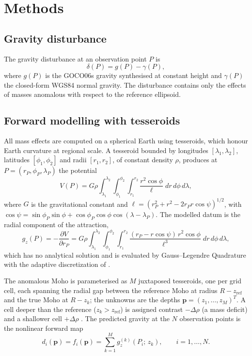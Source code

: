\documentclass[extra,mreferee]{gji}
\begin{document}
\section{Methods}
\subsection{Gravity disturbance}
The gravity disturbance at an observation point $P$ is
\begin{equation}
\delta(P) = g(P) - \gamma(P),
\label{eq:disturbance}
\end{equation}
where $g(P)$ is the {GOCO06s} gravity synthesised at constant height and
$\gamma(P)$ the closed-form {WGS84} normal gravity. The disturbance contains only
the effects of masses anomalous with respect to the reference ellipsoid.

\subsection{Forward modelling with tesseroids}
All mass effects are computed on a spherical Earth using tesseroids, which honour
Earth curvature at regional scale. A tesseroid bounded by longitudes
$[\lambda_1,\lambda_2]$, latitudes $[\phi_1,\phi_2]$ and radii $[r_1,r_2]$, of
constant density $\rho$, produces at $P=(r_P,\phi_P,\lambda_P)$ the potential
\begin{equation}
V(P) = G\rho \int_{\lambda_1}^{\lambda_2}\!\!\int_{\phi_1}^{\phi_2}\!\!\int_{r_1}^{r_2}
       \frac{r^2\cos\phi}{\ell}\; dr\,d\phi\,d\lambda,
\label{eq:potential}
\end{equation}
where $G$ is the gravitational constant and
$\ell=(r_P^2+r^2-2r_Pr\cos\psi)^{1/2}$, with
$\cos\psi=\sin\phi_P\sin\phi+\cos\phi_P\cos\phi\cos(\lambda-\lambda_P)$. The
modelled datum is the radial component of the attraction,
\begin{equation}
g_z(P) = -\frac{\partial V}{\partial r_P}
       = G\rho \int_{\lambda_1}^{\lambda_2}\!\!\int_{\phi_1}^{\phi_2}\!\!\int_{r_1}^{r_2}
         \frac{(r_P-r\cos\psi)\,r^2\cos\phi}{\ell^{3}}\; dr\,d\phi\,d\lambda,
\label{eq:gz}
\end{equation}
which has no analytical solution and is evaluated by Gauss--Legendre Quadrature
with the adaptive discretization of \citet{uieda2016}.

The anomalous Moho is parameterised as $M$ juxtaposed tesseroids, one per grid
cell, each spanning the radial gap between the reference Moho at radius
$R-z_{\mathrm{ref}}$ and the true Moho at $R-z_k$; the unknowns are the depths
$\mathbf{p}=(z_1,\dots,z_M)^{T}$. A cell deeper than the reference
($z_k>z_{\mathrm{ref}}$) is assigned contrast $-\Delta\rho$ (a mass deficit) and a
shallower cell $+\Delta\rho$ \citep{uieda2017}. The predicted gravity at the $N$
observation points is the nonlinear forward map
\begin{equation}
d_i(\mathbf{p}) = f_i(\mathbf{p}) = \sum_{k=1}^{M} g_z^{(k)}(P_i;\,z_k),
\qquad i=1,\dots,N.
\label{eq:forward}
\end{equation}
\end{document}
